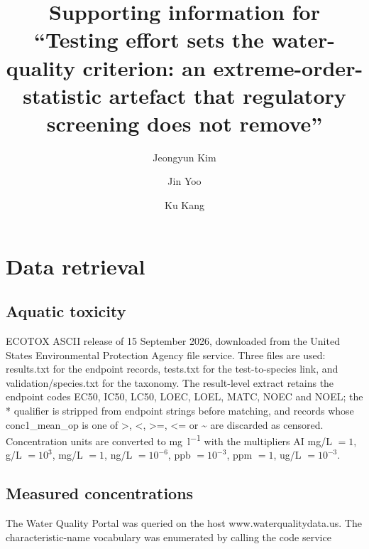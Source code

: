 \documentclass[preprint,11pt]{elsarticle}
\begin{document}
\begin{frontmatter}
\title{Supporting information for\\
``Testing effort sets the water-quality criterion: an extreme-order-statistic
artefact that regulatory screening does not remove''}
\author[snu]{Jeongyun Kim}
\author[cbdri]{Jin Yoo}
\author[cbdri]{Ku Kang}
\end{frontmatter}

\tableofcontents
\clearpage

\section{Data retrieval}

\subsection{Aquatic toxicity}

ECOTOX ASCII release of 15 September 2026, downloaded from the United States
Environmental Protection Agency file service. Three files are used:
\textsf{results.txt} for the endpoint records, \textsf{tests.txt} for the
test-to-species link, and \textsf{validation/species.txt} for the taxonomy. The
result-level extract retains the endpoint codes \textsf{EC50}, \textsf{IC50},
\textsf{LC50}, \textsf{LOEC}, \textsf{LOEL}, \textsf{MATC}, \textsf{NOEC} and
\textsf{NOEL}; the \textsf{*} qualifier is stripped from endpoint strings before
matching, and records whose \textsf{conc1\_mean\_op} is one of \textsf{>},
\textsf{<}, \textsf{>=}, \textsf{<=} or \textsf{\textasciitilde} are discarded
as censored. Concentration units are converted to \si{\milli\gram\per\litre}
with the multipliers \textsf{AI mg/L} $=1$, \textsf{g/L} $=10^{3}$,
\textsf{mg/L} $=1$, \textsf{ng/L} $=10^{-6}$, \textsf{ppb} $=10^{-3}$,
\textsf{ppm} $=1$, \textsf{ug/L} $=10^{-3}$.

\subsection{Measured concentrations}

The Water Quality Portal was queried on the host
\textsf{www.waterqualitydata.us}. The characteristic-name vocabulary was
enumerated by calling the code service
\end{document}
